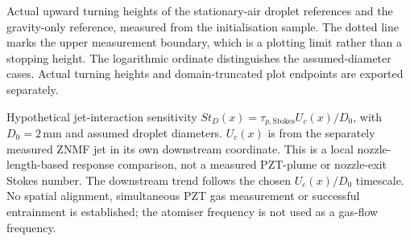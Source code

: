 \caption{Actual upward turning heights of the stationary-air droplet references and the gravity-only reference, measured from the initialisation sample. The dotted line marks the upper measurement boundary, which is a plotting limit rather than a stopping height. The logarithmic ordinate distinguishes the assumed-diameter cases. Actual turning heights and domain-truncated plot endpoints are exported separately.}

\caption{Hypothetical jet-interaction sensitivity $St_D(x)=\tau_{p,\mathrm{Stokes}}U_c(x)/D_0$, with $D_0=2\,\mathrm{mm}$ and assumed droplet diameters. $U_c(x)$ is from the separately measured ZNMF jet in its own downstream coordinate. This is a local nozzle-length-based response comparison, not a measured PZT-plume or nozzle-exit Stokes number. The downstream trend follows the chosen $U_c(x)/D_0$ timescale. No spatial alignment, simultaneous PZT gas measurement or successful entrainment is established; the atomiser frequency is not used as a gas-flow frequency.}

